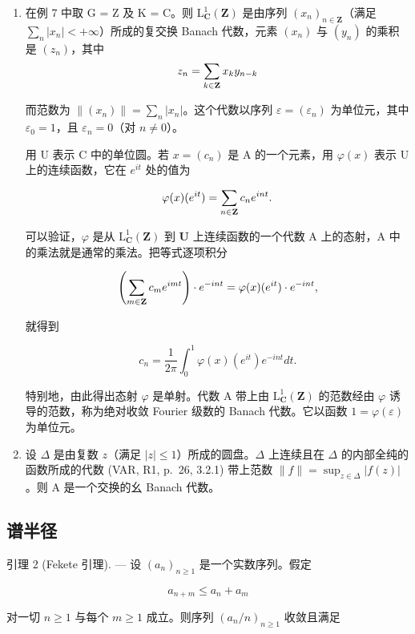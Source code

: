 \begin{enumerate}
\item
  在例 7 中取 G = Z 及 K = C。则 \(\mathrm{L}_{\mathbf{C}}^{1}(\mathbf{Z})\) 是由序列 \((x_{n})_{n\in\mathbf{Z}}\)（满足 \(\sum_{n}|x_{n}|<+\infty\)）所成的复交换 Banach 代数，元素 \((x_{n})\) 与 \((y_{n})\) 的乘积是 \((z_{n})\)，其中
\[
z _ {n} = \sum_ {k \in {\bf Z}} x _ {k} y _ {n - k}
\]

而范数为 \(\|(x_{n})\|=\sum_{n}|x_{n}|\)。这个代数以序列 \(\varepsilon=(\varepsilon_{n})\) 为单位元，其中 \(\varepsilon_{0}=1\)，且 \(\varepsilon_{n}=0\)（对 \(n\neq0\)）。

用 U 表示 C 中的单位圆。若 \(x = (c_{n})\) 是 A 的一个元素，用 \(\varphi(x)\) 表示 U 上的连续函数，它在 \(e^{it}\) 处的值为

\[
\varphi (x) (e ^ {i t}) = \sum_ {n \in {\bf Z}} c _ {n} e ^ {i n t}.
\]

可以验证，\(\varphi\) 是从 \(\mathrm{L}_{\mathbf{C}}^{1}(\mathbf{Z})\) 到 \(\mathbf{U}\) 上连续函数的一个代数 A 上的态射，A 中的乘法就是通常的乘法。把等式逐项积分

\[
\left(\sum_ {m \in {\bf Z}} c _ {m} e ^ {i m t}\right) \cdot e ^ {- i n t} = \varphi (x) (e ^ {i t}) \cdot e ^ {- i n t},
\]

就得到

\[
c _ {n} = \frac {1}{2 \pi} \int_ {0} ^ {1} \varphi (x) (e ^ {i t}) e ^ {- i n t} d t.
\]

特别地，由此得出态射 \(\varphi\) 是单射。代数 A 带上由 \(\mathrm{L}_{\mathbf{C}}^{1}(\mathbf{Z})\) 的范数经由 \(\varphi\) 诱导的范数，称为绝对收敛 Fourier 级数的 Banach 代数。它以函数 \(1 = \varphi(\varepsilon)\) 为单位元。

\item
  设 \(\Delta\) 是由复数 \(z\)（满足 \(|z| \leqslant 1\)）所成的圆盘。\(\Delta\) 上连续且在 \(\Delta\) 的内部全纯的函数所成的代数 (VAR, R1, p.~26, 3.2.1) 带上范数 \(\|f\| = \sup_{z \in \Delta} |f(z)|\)。则 A 是一个交换的幺 Banach 代数。
\end{enumerate}

\subsection{谱半径}

引理 2 (Fekete 引理). --- 设 \((a_{n})_{n\geqslant1}\) 是一个实数序列。假定

\[
a _ {n + m} \leqslant a _ {n} + a _ {m}
\]

对一切 \(n \geqslant 1\) 与每个 \(m \geqslant 1\) 成立。则序列 \((a_n / n)_{n \geqslant 1}\) 收敛且满足

